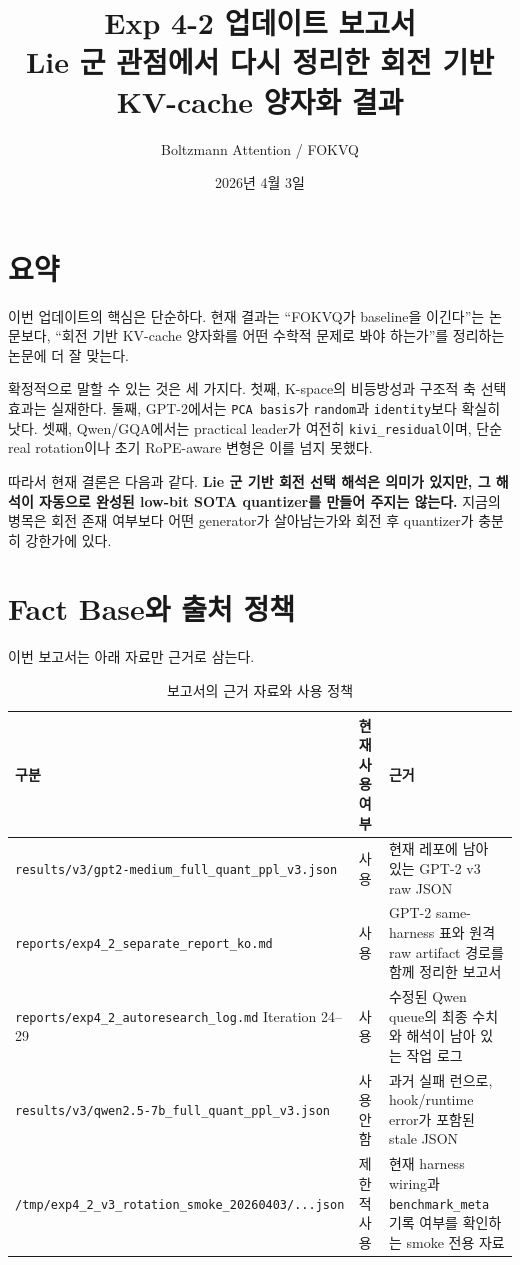 \documentclass[11pt,a4paper]{article}
\title{\textbf{Exp 4-2 업데이트 보고서}\\[0.4em]
\large Lie 군 관점에서 다시 정리한 회전 기반 KV-cache 양자화 결과}
\author{Boltzmann Attention / FOKVQ}
\date{2026년 4월 3일}
\begin{document}
\maketitle

\section{요약}

이번 업데이트의 핵심은 단순하다. 현재 결과는 ``FOKVQ가 baseline을 이긴다''는 논문보다, ``회전 기반 KV-cache 양자화를 어떤 수학적 문제로 봐야 하는가''를 정리하는 논문에 더 잘 맞는다.

확정적으로 말할 수 있는 것은 세 가지다. 첫째, K-space의 비등방성과 구조적 축 선택 효과는 실재한다. 둘째, GPT-2에서는 \texttt{PCA basis}가 \texttt{random}과 \texttt{identity}보다 확실히 낫다. 셋째, Qwen/GQA에서는 practical leader가 여전히 \texttt{kivi\_residual}이며, 단순 real rotation이나 초기 RoPE-aware 변형은 이를 넘지 못했다.

따라서 현재 결론은 다음과 같다. \textbf{Lie 군 기반 회전 선택 해석은 의미가 있지만, 그 해석이 자동으로 완성된 low-bit SOTA quantizer를 만들어 주지는 않는다.} 지금의 병목은 회전 존재 여부보다 어떤 generator가 살아남는가와 회전 후 quantizer가 충분히 강한가에 있다.

\section{Fact Base와 출처 정책}

이번 보고서는 아래 자료만 근거로 삼는다.

\begin{table}[H]
\centering
\caption{보고서의 근거 자료와 사용 정책}
\small
\begin{tabularx}{\textwidth}{@{}l l X@{}}
\toprule
\textbf{구분} & \textbf{현재 사용 여부} & \textbf{근거} \\
\midrule
\texttt{results/v3/gpt2-medium\_full\_quant\_ppl\_v3.json} & 사용 & 현재 레포에 남아 있는 GPT-2 v3 raw JSON \\
\texttt{reports/exp4\_2\_separate\_report\_ko.md} & 사용 & GPT-2 same-harness 표와 원격 raw artifact 경로를 함께 정리한 보고서 \\
\texttt{reports/exp4\_2\_autoresearch\_log.md} Iteration 24--29 & 사용 & 수정된 Qwen queue의 최종 수치와 해석이 남아 있는 작업 로그 \\
\texttt{results/v3/qwen2.5-7b\_full\_quant\_ppl\_v3.json} & 사용 안 함 & 과거 실패 런으로, hook/runtime error가 포함된 stale JSON \\
\texttt{/tmp/exp4\_2\_v3\_rotation\_smoke\_20260403/...json} & 제한적 사용 & 현재 harness wiring과 \texttt{benchmark\_meta} 기록 여부를 확인하는 smoke 전용 자료 \\
\bottomrule
\end{tabularx}
\end{table}
\end{document}
